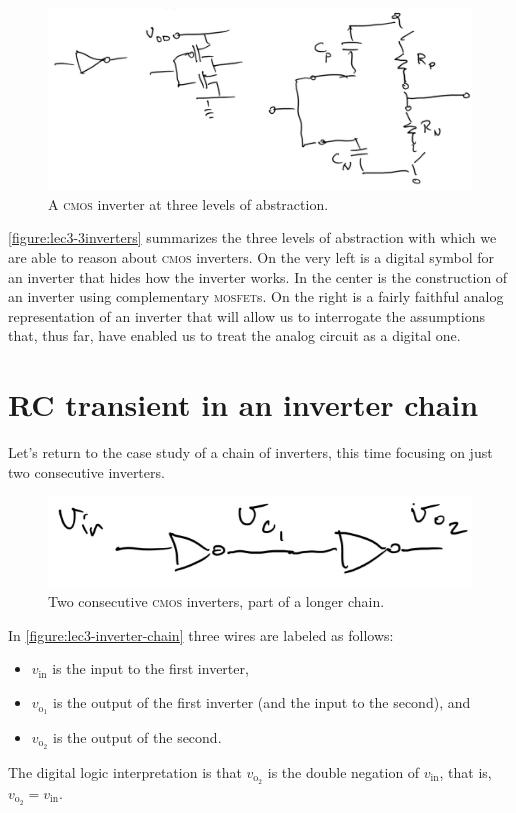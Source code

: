 \begin{figure}
  \centering
  \includegraphics[width=0.75\linewidth]{figures/3/3inverters}
  \caption{A \textsc{cmos} inverter at three levels of abstraction.}
  \label{figure:lec3-3inverters}
\end{figure}
\autoref{figure:lec3-3inverters} summarizes the three levels of abstraction with which we are able to reason about \textsc{cmos} inverters.
On the very left is a digital symbol for an inverter that hides how the inverter works.
In the center is the construction of an inverter using complementary \textsc{mosfet}s.
On the right is a fairly faithful analog representation of an inverter that will allow us to interrogate the assumptions that, thus far, have enabled us to treat the analog circuit as a digital one.

\section{RC transient in an inverter chain}
Let's return to the case study of a chain of inverters, this time focusing on just two consecutive inverters.
\begin{figure}
  \centering
  \includegraphics[width=0.75\linewidth]{figures/3/inverter-chain}
  \caption{Two consecutive \textsc{cmos} inverters, part of a longer chain.}
  \label{figure:lec3-inverter-chain}
\end{figure}
In \autoref{figure:lec3-inverter-chain} three wires are labeled as follows:
\begin{itemize}
  \item \(v_\text{in}\) is the input to the first inverter,
  \item \(v_{\text{o}_1}\) is the output of the first inverter (and the input to the second), and
  \item \(v_{\text{o}_2}\) is the output of the second.
\end{itemize}
The digital logic interpretation is that \(v_{\text{o}_2}\) is the double negation of \(v_\text{in}\), that is, \(v_{\text{o}_2} = v_\text{in}\).

